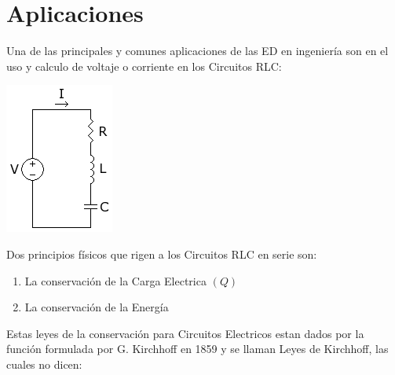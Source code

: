 \documentclass[10pt]{article}
\begin{document}
\section{Aplicaciones}
Una de las principales y comunes aplicaciones de las ED en ingeniería son en el uso y calculo de voltaje o corriente en los Circuitos RLC:
\begin{center}
  \includegraphics[scale=0.5]{imgsAux/rlc.png}
\end{center}
Dos principios físicos que rigen a los Circuitos RLC en serie son:
\begin{enumerate}
  \item La conservación de la Carga Electrica $(Q)$
  \item La conservación de la Energía
\end{enumerate}
Estas leyes de la conservación para Circuitos Electricos estan dados por la función formulada por G. Kirchhoff en 1859 y se llaman Leyes de Kirchhoff, las cuales no dicen:
\end{document}
